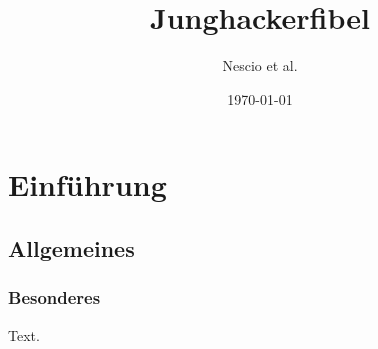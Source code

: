 \documentclass[a4paper,10pt]{scrbook}
\makeatletter
\DeclareRobustCommand{\,}{%
  \relax\ifmmode\mskip\thinmuskip\else\thinspace\fi
  \@ifstar{\hskip\z@skip}{}%
}
\makeatother
\begin{document}
\frontmatter

\title{Junghackerfibel}
\author{Nescio et al.}
\date{\today}
\maketitle




\tableofcontents %

\mainmatter

\chapter{Einführung}

\section{Allgemeines}

\subsection{Besonderes}

Text.
\end{document}
